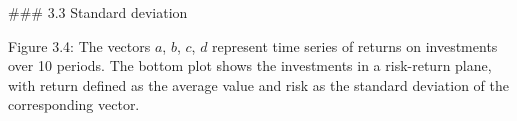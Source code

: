

### 3.3 Standard deviation

Figure 3.4: The vectors \(a\), \(b\), \(c\), \(d\) represent time series of returns on investments over 10 periods. The bottom plot shows the investments in a risk-return plane, with return defined as the average value and risk as the standard deviation of the corresponding vector.

